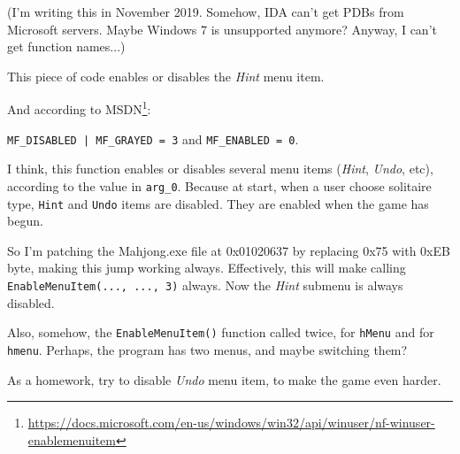 (I'm writing this in November 2019. Somehow, IDA can't get PDBs from Microsoft servers. Maybe Windows 7 is unsupported anymore?
Anyway, I can't get function names...)



This piece of code enables or disables the \emph{Hint} menu item.

And according to MSDN\footnote{\url{https://docs.microsoft.com/en-us/windows/win32/api/winuser/nf-winuser-enablemenuitem}}:

\verb$MF_DISABLED | MF_GRAYED = 3$ and \verb|MF_ENABLED = 0|.

I think, this function enables or disables several menu items (\emph{Hint}, \emph{Undo}, etc), according to the value in \verb|arg_0|.
Because at start, when a user choose solitaire type, \verb|Hint| and \verb|Undo| items are disabled.
They are enabled when the game has begun.

So I'm patching the Mahjong.exe file at 0x01020637 by replacing 0x75 with 0xEB byte, making this  jump working always.
Effectively, this will make calling \verb|EnableMenuItem(..., ..., 3)| always.
Now the \emph{Hint} submenu is always disabled.

Also, somehow, the \verb|EnableMenuItem()| function called twice, for \verb|hMenu| and for \verb|hmenu|.
Perhaps, the program has two menus, and maybe switching them?

As a homework, try to disable \emph{Undo} menu item, to make the game even harder.
